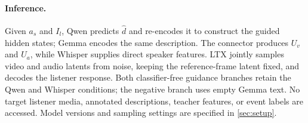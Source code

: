 \paragraph{Inference.}
Given $a_s$ and $I_l$, Qwen predicts $\hat d$ and re-encodes it to construct
the guided hidden states; Gemma encodes the same description. The
connector produces $U_v$ and $U_a$, while Whisper supplies direct speaker
features. LTX jointly samples video and audio latents from noise, keeping
the reference-frame latent fixed, and decodes the listener response.
Both classifier-free guidance branches retain the Qwen and Whisper
conditions; the negative branch uses empty Gemma text. No target listener
media, annotated descriptions, teacher features, or event labels are
accessed. Model versions and sampling settings are specified in
\cref{sec:setup}.
